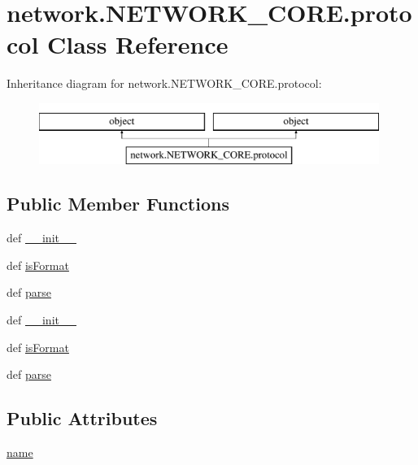 \hypertarget{classnetwork_1_1NETWORK__CORE_1_1protocol}{}\section{network.\+N\+E\+T\+W\+O\+R\+K\+\_\+\+C\+O\+R\+E.\+protocol Class Reference}
\label{classnetwork_1_1NETWORK__CORE_1_1protocol}
Inheritance diagram for network.\+N\+E\+T\+W\+O\+R\+K\+\_\+\+C\+O\+R\+E.\+protocol\+:\begin{figure}[H]
\begin{center}
\leavevmode
\includegraphics[height=2.000000cm]{classnetwork_1_1NETWORK__CORE_1_1protocol}
\end{center}
\end{figure}
\subsection*{Public Member Functions}
\begin{DoxyCompactItemize}
\item 
def \hyperlink{classnetwork_1_1NETWORK__CORE_1_1protocol_a1754de4b9a84dd46742631cdf072b993}{\+\_\+\+\_\+init\+\_\+\+\_\+}
\item 
def \hyperlink{classnetwork_1_1NETWORK__CORE_1_1protocol_a22c7d1bdfecc7b95f22def27922a6a16}{is\+Format}
\item 
def \hyperlink{classnetwork_1_1NETWORK__CORE_1_1protocol_ae949ee38090c3c7f80aec9a232571fd4}{parse}
\item 
def \hyperlink{classnetwork_1_1NETWORK__CORE_1_1protocol_a1754de4b9a84dd46742631cdf072b993}{\+\_\+\+\_\+init\+\_\+\+\_\+}
\item 
def \hyperlink{classnetwork_1_1NETWORK__CORE_1_1protocol_a22c7d1bdfecc7b95f22def27922a6a16}{is\+Format}
\item 
def \hyperlink{classnetwork_1_1NETWORK__CORE_1_1protocol_ae949ee38090c3c7f80aec9a232571fd4}{parse}
\end{DoxyCompactItemize}
\subsection*{Public Attributes}
\begin{DoxyCompactItemize}
\item 
\hyperlink{classnetwork_1_1NETWORK__CORE_1_1protocol_a1909533ebbc06331e4f698e614fe12db}{name}
\end{DoxyCompactItemize}


